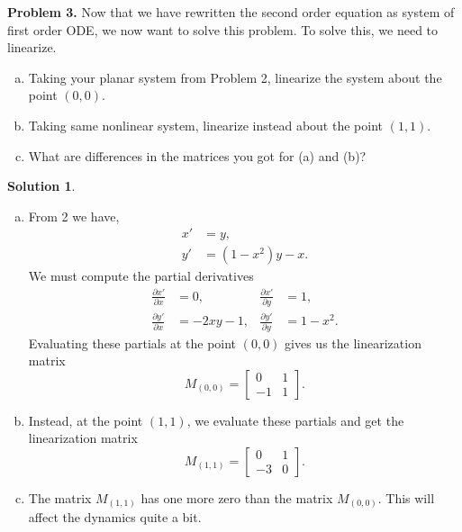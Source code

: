 \documentclass[12pt]{report} %
\theoremstyle{definition}
\newtheorem{solution}{Solution}
\begin{document}
\noindent\textbf{Problem 3.} Now that we have rewritten the second order equation as system of first order ODE, we now want to solve this problem.  To solve this, we need to linearize.
\begin{enumerate}[(a)]
    \item Taking your planar system from Problem 2, linearize the system about the point $(0,0)$. 
    \item Taking same nonlinear system, linearize instead about the point $(1,1)$.  
    \item What are differences in the matrices you got for (a) and (b)? 
\end{enumerate}
\begin{solution}~
\begin{enumerate}[(a)]
    \item From 2 we have,
    \begin{align*}
        x'&=y,\\
        y'&=(1-x^2)y-x.
    \end{align*}
    We must compute the partial derivatives
    \begin{align*}
        \frac{\partial x'}{\partial x} &= 0, & \frac{\partial x'}{\partial y}&=1,\\
        \frac{\partial y'}{\partial x} &= -2xy-1, & \frac{\partial y'}{\partial y}&=1-x^2.
    \end{align*}
    Evaluating these partials at the point $(0,0)$ gives us the linearization matrix
    \[
    M_{(0,0)}= \begin{bmatrix} 0 & 1\\ -1 & 1\end{bmatrix}.
    \]
    \item Instead, at the point $(1,1)$, we evaluate these partials and get the linearization matrix
    \[
    M_{(1,1)}=\begin{bmatrix} 0 & 1 \\ -3 & 0 \end{bmatrix}.
    \]
    \item The matrix $M_{(1,1)}$ has one more zero than the matrix $M_{(0,0)}$.  This will affect the dynamics quite a bit.
\end{enumerate}
\end{solution}
\vspace*{.5cm}
\end{document}
